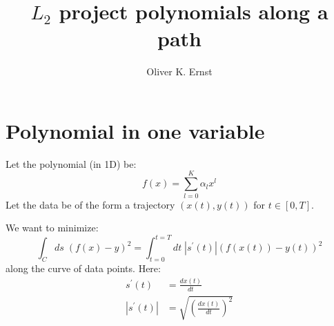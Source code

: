 \documentclass[11pt]{article}
\title{$L_2$ project polynomials along a path}
\author{Oliver K. Ernst}
\begin{document}
\maketitle
\tableofcontents


\section{Polynomial in one variable}


Let the polynomial (in 1D) be:
\begin{equation}
f(x) = \sum_{l=0}^K \alpha_l x^l
\end{equation}
Let the data be of the form a trajectory $(x(t),y(t))$ for $t \in [0,T]$.

We want to minimize:
\begin{equation}
\int_C ds \; \left ( f(x) - y \right )^2 = \int_{t=0}^{t=T} dt \; |s^\prime (t)| \left ( f(x(t)) - y(t) \right )^2
\end{equation}
along the curve of data points. Here:
\begin{equation}
\begin{split}
s^\prime(t) &= \frac{dx(t)}{dt} \\
|s^\prime(t)| &= \sqrt{ \left ( \frac{dx(t)}{dt} \right )^2}
\end{split}
\end{equation}
\end{document}
